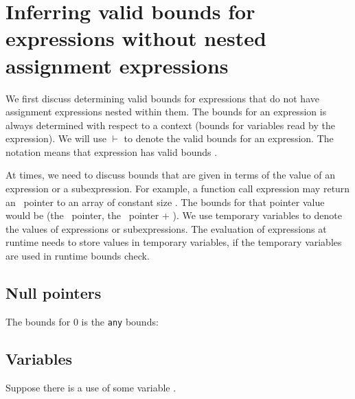 \section{Inferring valid bounds for expressions without nested assignment expressions}
\label{section:inferring-expression-bounds}

We first discuss determining valid bounds for expressions that do not
have assignment expressions nested within them. The bounds for an
expression is always determined with respect to a context (bounds for
variables read by the expression). We will use $\vdash$ to denote the
valid bounds for an expression. The notation 
means that expression  has valid bounds .

At times, we need to discuss bounds that are given in terms of the value
of an expression or a subexpression.   For example, a function call expression may
return an \arrayptr\ pointer to an array of constant size
. The bounds for that pointer value would be (the
\arrayptr\ pointer, the \arrayptr\ pointer +
). We use temporary variables to denote the values
of expressions or subexpressions.   The evaluation of
expressions at runtime needs to store values in temporary
variables, if the temporary variables are used in runtime
bounds check.

\subsection{Null pointers}

The bounds for 0 is the \lstinline|any| bounds:


\subsection{Variables}
\label{section:checking-variables}

Suppose there is a use of some variable .

